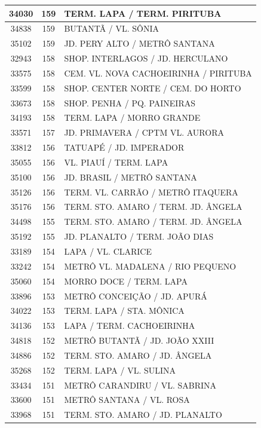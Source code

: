\documentclass[
	12pt,				%
	oneside,			%
	a4paper,			%
	english,			%
	brazil				%
	]{abntex2ppgsi}
\begin{document}
{{\begin{apendicesenv}
\begin{longtable}{c|c|p{7cm}}
 \hline 
34030 &	159 &	TERM. LAPA / TERM. PIRITUBA \\ 
 \hline 
34838 &	159 &	BUTANTÃ / VL. SÔNIA \\ 
 \hline 
35102 &	159 &	JD. PERY ALTO / METRÔ SANTANA \\ 
 \hline 
32943 &	158 &	SHOP. INTERLAGOS / JD. HERCULANO \\ 
 \hline 
33575 &	158 &	CEM. VL. NOVA CACHOEIRINHA / PIRITUBA \\ 
 \hline 
33599 &	158 &	SHOP. CENTER NORTE / CEM. DO HORTO \\ 
 \hline 
33673 &	158 &	SHOP. PENHA / PQ. PAINEIRAS \\ 
 \hline 
34193 &	158 &	TERM. LAPA / MORRO GRANDE \\ 
 \hline 
33571 &	157 &	JD. PRIMAVERA / CPTM VL. AURORA \\ 
 \hline 
33812 &	156 &	TATUAPÉ / JD. IMPERADOR \\ 
 \hline 
35055 &	156 &	VL. PIAUÍ / TERM. LAPA \\ 
 \hline 
35100 &	156 &	JD. BRASIL / METRÔ SANTANA \\ 
 \hline 
35126 &	156 &	TERM. VL. CARRÃO / METRÔ ITAQUERA \\ 
 \hline 
35176 &	156 &	TERM. STO. AMARO / TERM. JD. ÂNGELA \\ 
 \hline 
34498 &	155 &	TERM. STO. AMARO / TERM. JD. ÂNGELA \\ 
 \hline 
35192 &	155 &	JD. PLANALTO / TERM. JOÃO DIAS \\ 
 \hline 
33189 &	154 &	LAPA / VL. CLARICE \\ 
 \hline 
33242 &	154 &	METRÔ VL. MADALENA / RIO PEQUENO \\ 
 \hline 
35060 &	154 &	MORRO DOCE / TERM. LAPA \\ 
 \hline 
33896 &	153 &	METRÔ CONCEIÇÃO / JD. APURÁ \\ 
 \hline 
34022 &	153 &	TERM. LAPA / STA. MÔNICA \\ 
 \hline 
34136 &	153 &	LAPA / TERM. CACHOEIRINHA \\ 
 \hline 
34818 &	152 &	METRÔ BUTANTÃ / JD. JOÃO XXIII \\ 
 \hline 
34886 &	152 &	TERM. STO. AMARO / JD. ÂNGELA \\ 
 \hline 
35268 &	152 &	TERM. LAPA / VL. SULINA \\ 
 \hline 
33434 &	151 &	METRÔ CARANDIRU / VL. SABRINA \\ 
 \hline 
33600 &	151 &	METRÔ SANTANA / VL. ROSA \\ 
 \hline 
33968 &	151 &	TERM. STO. AMARO / JD. PLANALTO \\ 

\end{longtable}
\end{apendicesenv}}}
\end{document}
